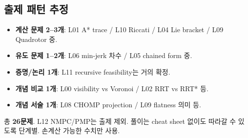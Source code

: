 \documentclass[11pt,a4paper]{article}
\begin{document}
\subsection*{출제 패턴 추정}

\begin{itemize}
  \item \textbf{계산 문제 2--3개}: L01 A* trace / L10 Riccati / L04 Lie bracket / L09 Quadrotor 중.
  \item \textbf{유도 문제 1--2개}: L06 min-jerk 차수 / L05 chained form 중.
  \item \textbf{증명/논리 1개}: L11 recursive feasibility는 거의 확정.
  \item \textbf{개념 비교 1개}: L00 visibility vs Voronoi / L02 RRT vs RRT* 등.
  \item \textbf{개념 서술 1개}: L08 CHOMP projection / L09 flatness 의미 등.
\end{itemize}

총 \textbf{26문제}. L12 NMPC/PMP는 출제 제외. 풀이는 cheat sheet 없이도 따라갈 수 있도록 단계별. 손계산 가능한 수치만 사용.
\end{document}
